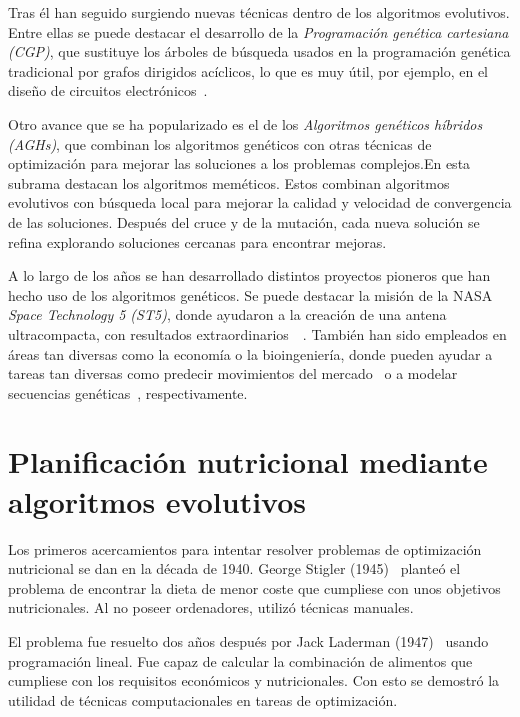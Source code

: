 Tras él han seguido surgiendo nuevas técnicas dentro de los algoritmos evolutivos. Entre ellas se puede destacar el desarrollo de la \textit{Programación genética cartesiana (CGP)}, que sustituye los árboles de búsqueda usados en la programación genética tradicional por grafos dirigidos acíclicos, lo que es muy útil, por ejemplo, en el diseño de circuitos electrónicos~\cite{miller1997}.

Otro avance que se ha popularizado es el de los \textit{Algoritmos genéticos híbridos (AGHs)}, que combinan los algoritmos genéticos con otras técnicas de optimización para mejorar las soluciones a los problemas complejos.\newpage En esta subrama destacan los algoritmos meméticos. Estos combinan algoritmos evolutivos con búsqueda local para mejorar la calidad y velocidad de convergencia de las soluciones. Después del cruce y de la mutación, cada nueva solución se refina explorando soluciones cercanas para encontrar mejoras.~\cite{moscato2003}

A lo largo de los años se han desarrollado distintos proyectos pioneros que han hecho uso de los algoritmos genéticos. Se puede destacar la misión de la NASA \textit{Space Technology 5 (ST5)}, donde ayudaron a la creación de una antena ultracompacta, con resultados extraordinarios~\cite{nasa2006}~\cite{lohn2004}. También han sido empleados en áreas tan diversas como la economía o la bioingeniería, donde pueden ayudar a tareas tan diversas como predecir movimientos del mercado~\cite{abraham2022} o a modelar secuencias genéticas~\cite{notredame1996}, respectivamente.

\section{Planificación nutricional mediante algoritmos evolutivos}

Los primeros acercamientos para intentar resolver problemas de optimización nutricional se dan en la década de 1940. George Stigler (1945)~\cite{stigler1945} planteó el problema de encontrar la dieta de menor coste que cumpliese con unos objetivos nutricionales. Al no poseer ordenadores, utilizó técnicas manuales.

El problema fue resuelto dos años después por Jack Laderman (1947)~\cite{problemasdedietas} usando programación lineal. Fue capaz de calcular la combinación de alimentos que cumpliese con los requisitos económicos y nutricionales. Con esto se demostró la utilidad de técnicas computacionales en tareas de optimización.

